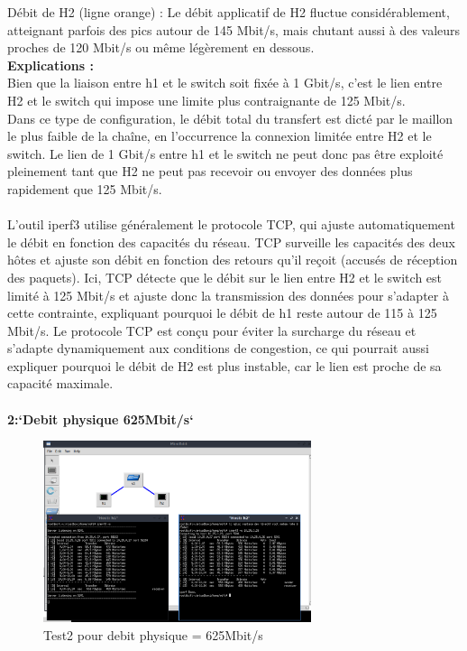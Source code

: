 Débit de H2 (ligne orange) : Le débit applicatif de H2 fluctue considérablement, atteignant parfois des pics autour de 145 Mbit/s, mais chutant aussi à des valeurs proches de 120 Mbit/s ou même légèrement en dessous.
\vspace{1cm}
\\
\textbf{Explications :} 
\\
Bien que la liaison entre h1 et le switch soit fixée à 1 Gbit/s, c'est le lien entre H2 et le switch qui impose une limite plus contraignante de 125 Mbit/s.\\
Dans ce type de configuration, le débit total du transfert est dicté par le maillon le plus faible de la chaîne, en l’occurrence la connexion limitée entre H2 et le switch. Le lien de 1 Gbit/s entre h1 et le switch ne peut donc pas être exploité pleinement tant que H2 ne peut pas recevoir ou envoyer des données plus rapidement que 125 Mbit/s.\\
\\
L'outil iperf3 utilise généralement le protocole TCP, qui ajuste automatiquement le débit en fonction des capacités du réseau. TCP surveille les capacités des deux hôtes et ajuste son débit en fonction des retours qu’il reçoit (accusés de réception des paquets).
Ici, TCP détecte que le débit sur le lien entre H2 et le switch est limité à 125 Mbit/s et ajuste donc la transmission des données pour s’adapter à cette contrainte, expliquant pourquoi le débit de h1 reste autour de 115 à 125 Mbit/s.
Le protocole TCP est conçu pour éviter la surcharge du réseau et s’adapte dynamiquement aux conditions de congestion, ce qui pourrait aussi expliquer pourquoi le débit de H2 est plus instable, car le lien est proche de sa capacité maximale.\\
\\
\textbf{2:`Debit physique 625Mbit/s`} 
\begin{figure}[H]
    \centering
    \includegraphics[width=0.7\textwidth]{./images/T1.2/625test2.png}
    \caption{Test2 pour debit physique = 625Mbit/s}
    \label{fig:exemple}
\end{figure}
